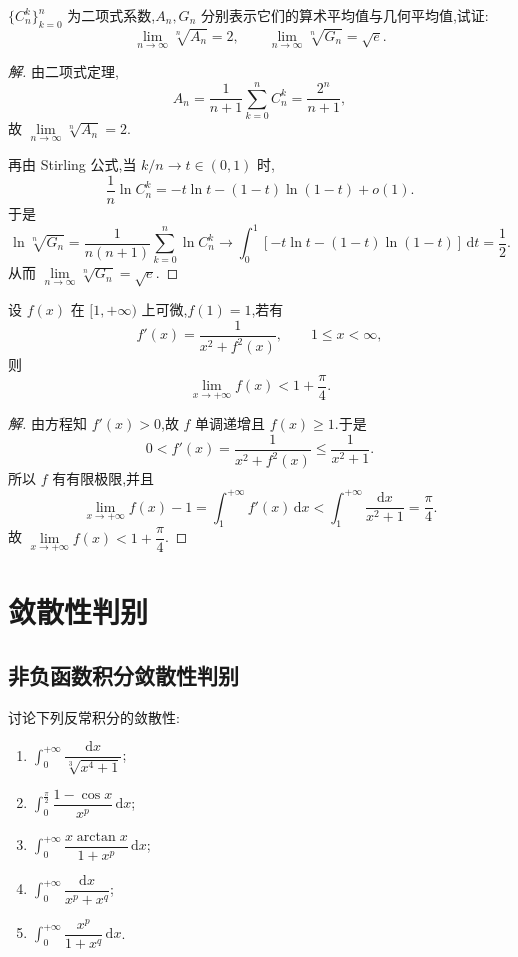 \documentclass[../../数学分析培优讲义(答案版).tex]{subfiles}
\begin{document}
\begin{example}
$\{C_{n}^{k}\}_{k=0}^n$ 为二项式系数,$A_n,G_n$ 分别表示它们的算术平均值与几何平均值,试证:
\[
    \lim\limits_{n\to\infty}\sqrt[n]{A_n}=2,
    \qquad
    \lim\limits_{n\to\infty}\sqrt[n]{G_n}=\sqrt{e}.
\]
\end{example}

\begin{proof}[解]
由二项式定理,
\[
    A_n=\dfrac{1}{n+1}\sum\limits_{k=0}^nC_n^k=\dfrac{2^n}{n+1},
\]
故 $\displaystyle\lim\limits_{n\to\infty}\sqrt[n]{A_n}=2$.

再由 Stirling 公式,当 $k/n\to t\in(0,1)$ 时,
\[
    \dfrac{1}{n}\ln C_n^k
    =-t\ln t-(1-t)\ln(1-t)+o(1).
\]
于是
\[
    \ln\sqrt[n]{G_n}
    =\dfrac{1}{n(n+1)}\sum\limits_{k=0}^n\ln C_n^k
    \longrightarrow\int_0^1[-t\ln t-(1-t)\ln(1-t)]\,\mathrm{d}t
    =\dfrac{1}{2}.
\]
从而 $\displaystyle\lim\limits_{n\to\infty}\sqrt[n]{G_n}=\sqrt e$.
\end{proof}

\begin{example}
设 $f(x)$ 在 $\lbrack 1,+\infty)$ 上可微,$f(1)=1$,若有
\[
    f'(x)=\dfrac{1}{x^2+f^2(x)},
    \qquad 1\leq x<\infty,
\]
则
\[
    \lim\limits_{x\to+\infty}f(x)<1+\dfrac{\pi}{4}.
\]
\end{example}

\begin{proof}[解]
由方程知 $f'(x)>0$,故 $f$ 单调递增且 $f(x)\geq1$.于是
\[
    0<f'(x)=\dfrac{1}{x^2+f^2(x)}\leq\dfrac{1}{x^2+1}.
\]
所以 $f$ 有有限极限,并且
\[
    \lim\limits_{x\to+\infty}f(x)-1
    =\int_1^{+\infty}f'(x)\,\mathrm{d}x
    <\int_1^{+\infty}\dfrac{\mathrm{d}x}{x^2+1}
    =\dfrac{\pi}{4}.
\]
故 $\displaystyle\lim\limits_{x\to+\infty}f(x)<1+\dfrac{\pi}{4}$.
\end{proof}

\newpage

\section{敛散性判别}

\subsection{非负函数积分敛散性判别}

\begin{example}
讨论下列反常积分的敛散性:
\begin{enumerate}[label=(\arabic*)]
    \item $\displaystyle\int_0^{+\infty}\dfrac{\mathrm{d}x}{\sqrt[3]{x^4+1}}$;
    \item $\displaystyle\int_0^{\frac{\pi}{2}}\dfrac{1-\cos x}{x^p}\,\mathrm{d}x$;
    \item $\displaystyle\int_0^{+\infty}\dfrac{x\arctan x}{1+x^p}\,\mathrm{d}x$;
    \item $\displaystyle\int_0^{+\infty}\dfrac{\mathrm{d}x}{x^p+x^q}$;
    \item $\displaystyle\int_0^{+\infty}\dfrac{x^p}{1+x^q}\,\mathrm{d}x$.
\end{enumerate}
\end{example}
\end{document}
